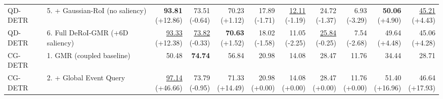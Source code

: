 \documentclass{article}
\begin{document}
{\begin{tabular}{llrrrrrrrrr}
QD-DETR & 5. + Gaussian-RoI (no saliency) & \shortstack{\textbf{93.81} \\ {\scriptsize (+12.86)}} & \shortstack{73.51 \\ {\scriptsize (-0.64)}} & \shortstack{70.23 \\ {\scriptsize (+1.12)}} & \shortstack{17.89 \\ {\scriptsize (-1.71)}} & \shortstack{\underline{12.11} \\ {\scriptsize (-1.19)}} & \shortstack{24.72 \\ {\scriptsize (-1.37)}} & \shortstack{6.93 \\ {\scriptsize (-3.29)}} & \shortstack{\textbf{50.06} \\ {\scriptsize (+4.90)}} & \shortstack{\underline{45.21} \\ {\scriptsize (+4.43)}} \\
QD-DETR & 6. Full DeRoI-GMR (+6D saliency) & \shortstack{\underline{93.33} \\ {\scriptsize (+12.38)}} & \shortstack{\underline{73.82} \\ {\scriptsize (-0.33)}} & \shortstack{\textbf{70.63} \\ {\scriptsize (+1.52)}} & \shortstack{18.02 \\ {\scriptsize (-1.58)}} & \shortstack{11.05 \\ {\scriptsize (-2.25)}} & \shortstack{\underline{25.84} \\ {\scriptsize (-0.25)}} & \shortstack{7.54 \\ {\scriptsize (-2.68)}} & \shortstack{49.64 \\ {\scriptsize (+4.48)}} & \shortstack{45.06 \\ {\scriptsize (+4.28)}} \\
\midrule
CG-DETR & 1. GMR (coupled baseline) & 50.48 & \textbf{74.74} & 56.84 & 20.98 & 14.08 & 28.47 & 11.76 & 34.44 & 28.71 \\
CG-DETR & 2. + Global Event Query & \shortstack{\underline{97.14} \\ {\scriptsize (+46.66)}} & \shortstack{73.79 \\ {\scriptsize (-0.95)}} & \shortstack{71.33 \\ {\scriptsize (+14.49)}} & \shortstack{20.98 \\ {\scriptsize (+0.00)}} & \shortstack{14.08 \\ {\scriptsize (+0.00)}} & \shortstack{28.47 \\ {\scriptsize (+0.00)}} & \shortstack{11.76 \\ {\scriptsize (+0.00)}} & \shortstack{51.40 \\ {\scriptsize (+16.96)}} & \shortstack{46.64 \\ {\scriptsize (+17.93)}} \\

\end{tabular}}
\end{document}
